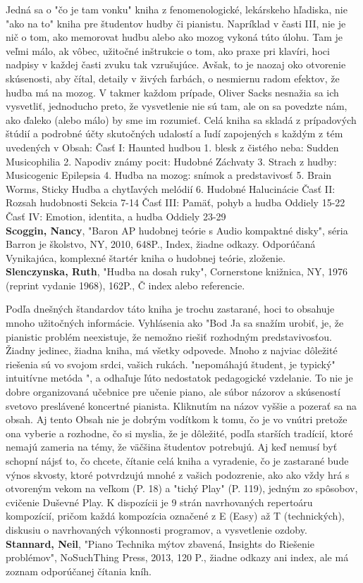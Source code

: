 \documentclass[11pt,a4paper%
]{article}
\begin{document}
Jedná sa o "čo je tam vonku" kniha z fenomenologické, lekárskeho hľadiska, nie "ako na to"
kniha pre študentov hudby či pianistu. Napríklad v časti III, nie je nič o tom, ako memorovat hudbu alebo ako mozog vykoná túto úlohu. Tam je veľmi málo, ak vôbec, užitočné inštrukcie o tom, ako praxe pri klavíri, hoci nadpisy v každej časti zvuku tak vzrušujúce. Avšak, to je naozaj oko
otvorenie skúsenosti, aby čítal, detaily v živých farbách, o nesmiernu radom efektov, že hudba má na mozog. V takmer každom prípade, Oliver Sacks nesnažia sa ich vysvetliť, jednoducho preto, že vysvetlenie nie sú
tam, ale on sa povedzte nám, ako ďaleko (alebo málo) by sme im rozumieť.
Celá kniha sa skladá z prípadových štúdií a podrobné účty skutočných udalostí a ľudí zapojených
s každým z tém uvedených v Obsah:
Časť I: Haunted hudbou
1. blesk z čistého neba: Sudden Musicophilia
2. Napodiv známy pocit: Hudobné Záchvaty
3. Strach z hudby: Musicogenic Epilepsia
4. Hudba na mozog: snímok a predstavivosť
5. Brain Worms, Sticky Hudba a chytľavých melódií
6. Hudobné Halucinácie
Časť II: Rozsah hudobnosti
Sekcia 7-14
Časť III: Pamäť, pohyb a hudba
Oddiely 15-22
Časť IV: Emotion, identita, a hudba
Oddiely 23-29
\medskip\\
\textbf{Scoggin, Nancy}, "Baron AP hudobnej teórie s Audio kompaktné disky", séria Barron je školstvo, NY,
2010, 648P., Index, žiadne odkazy. Odporúčaná
Vynikajúca, komplexné štartér kniha o hudobnej teórie, zloženie.
\medskip\\
\textbf{Slenczynska, Ruth}, "Hudba na dosah ruky", Cornerstone knižnica, NY, 1976 (reprint vydanie 1968), 162P., Č index alebo referencie.

Podľa dnešných štandardov táto kniha je trochu zastarané, hoci to obsahuje mnoho užitočných informácie. Vyhlásenia ako "Bod Ja sa snažím urobiť, je, že pianistic problém neexistuje, že nemožno riešiť rozhodným predstavivosťou. Žiadny jedinec, žiadna kniha, má všetky odpovede. Mnoho z najviac dôležité riešenia sú vo svojom srdci, vašich rukách. "nepomáhajú študent, je typický" intuitívne metóda ", a odhaľuje ľúto nedostatok pedagogické vzdelanie. To nie je dobre organizovaná učebnice pre učenie piano, ale súbor názorov a skúseností svetovo preslávené koncertné pianista. Kliknutím na názov vyššie a pozerať sa na obsah. Aj tento Obsah nie je dobrým vodítkom k tomu, čo je vo vnútri pretože ona vyberie a rozhodne, čo si myslia, že je dôležité, podľa starších tradícií, ktoré nemajú zameria na témy, že väčšina študentov potrebujú. Aj keď nemusí byť schopní nájsť to, čo chcete, čítanie celá kniha a vyradenie, čo je zastarané bude výnos skvosty, ktoré potvrdzujú mnohé z vašich podozrenie, ako ako vždy hrá s otvoreným vekom na veľkom (P. 18) a "tichý Play" (P. 119), jedným zo spôsobov, cvičenie Duševné Play. K dispozícii je 9 strán navrhovaných repertoáru kompozícií, pričom každá kompozícia označené z E (Easy) až T (technických), diskusiu o navrhovaných výkonnosti programov, a vysvetlenie
ozdoby.
\medskip\\
\textbf{Stannard, Neil}, "Piano Technika mýtov zbavená, Insights do Riešenie problémov", NoSuchThing Press, 2013, 120 P., žiadne odkazy ani index, ale má zoznam odporúčanej čítania kníh. 
\end{document}
